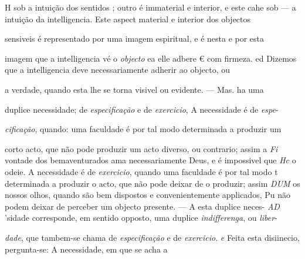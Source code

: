 H sob a intuição dos sentidos ; outro é immaterial e interior, e este cahe sob --- a intuição da intelligencia. Este aspect material e interior dos objectos

sensiveis é representado por uma imagem espiritual, e é nesta e por esta

imagem que a intelligencia vé o \emph{objecto} ea elle adbere € com firmeza. ed Dizemos que a intelligencia deve necessariamente adherir ao objecto, ou

a verdade, quando esta lhe se torna visivel ou evidente. --- Mas. ha uma

duplice necessidade; de \emph{especificação} e de \emph{exercicio}, A necessidade é de \emph{espe}-

\emph{cificação}, quando: uma faculdade é por tal modo determinada a produzir um

corto acto, que não pode produzir um acto diverso, ou contrario; assim a \emph{Fi} vontade dos bemaventurados ama necessariamente Deus, e é impossivel que \emph{Hc} o odeie. A necessidade é de \emph{exercicio}, quando uma faculdade é por tal modo t determinada a produzir o acto, que não pode deixar de o produzir; assim \emph{DUM} os nossos olhos, quando são bem dispostos e convenientemente applicados, Pu não podem deixar de perceber um objecto presente. --- A esta duplice neces- \emph{AD} 'sidade corresponde, em sentido opposto, uma duplice \emph{indifferenga}, ou \emph{liber}-

\emph{dade}, que tambem-se chama de \emph{especificação} e de \emph{exercicio}. \emph{e} Feita esta disiinecio, pergunta-se: A necessidade, em que se acha a

